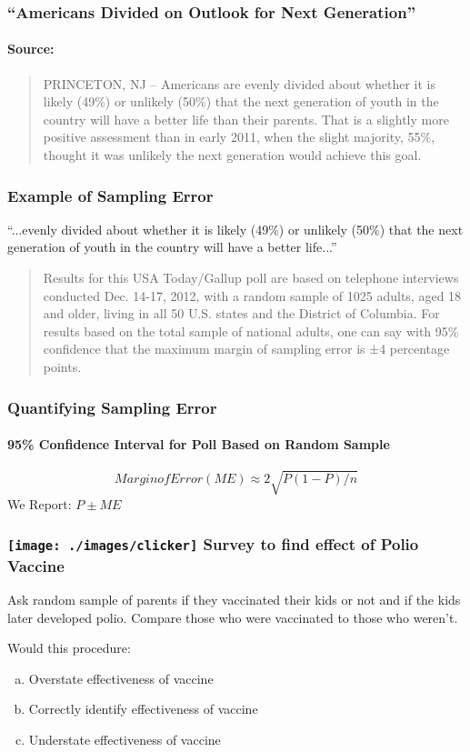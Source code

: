 \documentclass[handout]{beamer}
\begin{document}

\begin{frame}
\frametitle{``Americans Divided on Outlook for Next Generation''}
\framesubtitle{Source: \href{http://www.gallup.com/poll/159737/americans-divided-outlook-next-generation.aspx}{}}
\vspace{1em}
\begin{quote}
PRINCETON, NJ -- Americans are evenly divided about whether it is likely (49\%) or unlikely (50\%) that the next generation of youth in the country will have a better life than their parents. That is a slightly more positive assessment than in early 2011, when the slight majority, 55\%, thought it was unlikely the next generation would achieve this goal.
\end{quote}
\end{frame}

\begin{frame}
\frametitle{Example of Sampling Error}
``...evenly divided about whether it is likely (49\%) or unlikely (50\%) that the next generation of youth in the country will have a better life...''

\vspace{2em}
\begin{quote}
Results for this USA Today/Gallup poll are based on telephone interviews conducted Dec. 14-17, 2012, with a \alert{random sample of 1025 adults}, aged 18 and older, living in all 50 U.S. states and the District of Columbia. For results based on the total sample of national adults, one can say with \alert{95\% confidence that the maximum margin of sampling error is ±4 percentage points}.
\end{quote}
\end{frame}
\begin{frame}
\frametitle{Quantifying Sampling Error}
\framesubtitle{95\% Confidence Interval for Poll Based on Random Sample}
	$$Margin of Error (ME) \approx 2 \sqrt{P(1-P)/n}$$
	We Report: $P \pm ME$
\end{frame}

\begin{frame}
\frametitle{\texttt{[image: ./images/clicker]} \hfill Survey to find effect of Polio Vaccine}
Ask random sample of parents if they vaccinated their kids or not and if the kids later developed polio. Compare those who were vaccinated to those who weren't.

\vspace{1em}


Would this procedure:
	\begin{enumerate}[(a)]
		\item Overstate effectiveness of vaccine
		\item Correctly identify effectiveness of vaccine
		\item Understate effectiveness of vaccine
	\end{enumerate}

\end{frame}
\end{document}

